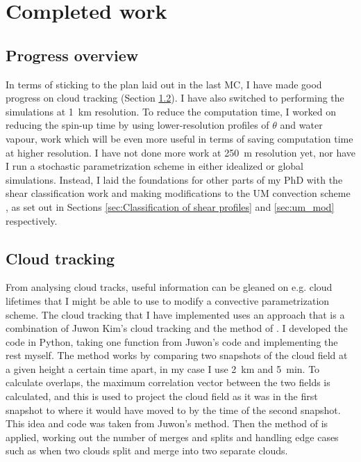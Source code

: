 \documentclass[11pt,a4paper]{article}
\begin{document}
\section{Completed work}
\label{sec:Completed work}

\subsection{Progress overview}
\label{sec:Progress overview}

In terms of sticking to the plan laid out in the last MC, I have made good progress on cloud tracking (Section \ref{sec:Cloud tracking}). I have also switched to performing the simulations at \SI{1}{km} resolution. To reduce the computation time, I worked on reducing the spin-up time by using lower-resolution profiles of $\theta$ and water vapour, work which will be even more useful in terms of saving computation time at higher resolution. I have not done more work at \SI{250}{m} resolution yet, nor have I run a stochastic parametrization scheme in either idealized or global simulations. Instead, I laid the foundations for other parts of my PhD with the shear classification work and making modifications to the UM convection scheme \parencite{gregory1990mass}, as set out in Sections \ref{sec:Classification of shear profiles} and \ref{sec:um_mod} respectively.

\subsection{Cloud tracking}
\label{sec:Cloud tracking}


From analysing cloud tracks, useful information can be gleaned on e.g. cloud lifetimes that I might be able to use to modify a convective parametrization scheme. The cloud tracking that I have implemented uses an approach that is a combination of Juwon Kim's cloud tracking and the method of \cite{plant2009statistical}.
I developed the code in Python, taking one function from Juwon's code and implementing the rest myself.
The method works by comparing two snapshots of the cloud field at a given height a certain time apart, in my case I use \SI{2}{km} and \SI{5}{min}. To calculate overlaps, the maximum correlation vector between the two fields is calculated, and this is used to project the cloud field as it was in the first snapshot to where it would have moved to by the time of the second snapshot. This idea and code was taken from Juwon's method. Then the method of \cite{plant2009statistical} is applied, working out the number of merges and splits and handling edge cases such as when two clouds split and merge into two separate clouds.
\end{document}
